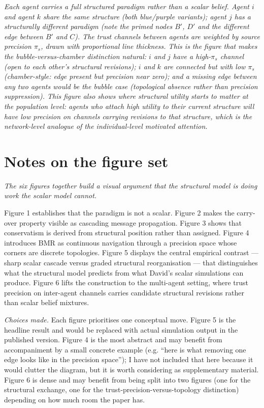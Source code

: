 \documentclass[11pt]{article}
\begin{document}
\noindent\textit{\textcolor{notegrey}{Each agent carries a full structured paradigm rather than a scalar belief. Agent $i$ and agent $k$ share the same structure (both blue/purple variants); agent $j$ has a structurally different paradigm (note the primed nodes $B'$, $D'$ and the different edge between $B'$ and $C$). The trust channels between agents are weighted by source precision $\pi_s$, drawn with proportional line thickness. This is the figure that makes the bubble-versus-chamber distinction natural: $i$ and $j$ have a high-$\pi_s$ channel (open to each other's structural revisions); $i$ and $k$ are connected but with low $\pi_s$ (chamber-style: edge present but precision near zero); and a missing edge between any two agents would be the bubble case (topological absence rather than precision suppression). This figure also shows where structural utility starts to matter at the population level: agents who attach high utility to their current structure will have low precision on channels carrying revisions to that structure, which is the network-level analogue of the individual-level motivated attention.}}

\newpage
\section*{Notes on the figure set}

\textit{The six figures together build a visual argument that the structural model is doing work the scalar model cannot.}

Figure 1 establishes that the paradigm is not a scalar. Figure 2 makes the carry-over property visible as cascading message propagation. Figure 3 shows that conservatism is derived from structural position rather than assigned. Figure 4 introduces BMR as continuous navigation through a precision space whose corners are discrete topologies. Figure 5 displays the central empirical contrast — sharp scalar cascade versus graded structural reorganisation — that distinguishes what the structural model predicts from what David's scalar simulations can produce. Figure 6 lifts the construction to the multi-agent setting, where trust precision on inter-agent channels carries candidate structural revisions rather than scalar belief mixtures.

\textit{Choices made.} Each figure prioritises one conceptual move. Figure 5 is the headline result and would be replaced with actual simulation output in the published version. Figure 4 is the most abstract and may benefit from accompaniment by a small concrete example (e.g. ``here is what removing one edge looks like in the precision space''); I have not included that here because it would clutter the diagram, but it is worth considering as supplementary material. Figure 6 is dense and may benefit from being split into two figures (one for the structural exchange, one for the trust-precision-versus-topology distinction) depending on how much room the paper has.
\end{document}
